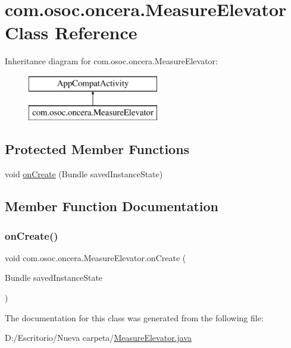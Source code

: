\hypertarget{classcom_1_1osoc_1_1oncera_1_1_measure_elevator}{}\section{com.\+osoc.\+oncera.\+Measure\+Elevator Class Reference}
\label{classcom_1_1osoc_1_1oncera_1_1_measure_elevator}
Inheritance diagram for com.\+osoc.\+oncera.\+Measure\+Elevator\+:\begin{figure}[H]
\begin{center}
\leavevmode
\includegraphics[height=2.000000cm]{classcom_1_1osoc_1_1oncera_1_1_measure_elevator}
\end{center}
\end{figure}
\subsection*{Protected Member Functions}
\begin{DoxyCompactItemize}
\item 
void \mbox{\hyperlink{classcom_1_1osoc_1_1oncera_1_1_measure_elevator_a27c3aaab3d8659cbf6de25f0f636dd6a}{on\+Create}} (Bundle saved\+Instance\+State)
\end{DoxyCompactItemize}


\subsection{Member Function Documentation}
\mbox{\label{classcom_1_1osoc_1_1oncera_1_1_measure_elevator_a27c3aaab3d8659cbf6de25f0f636dd6a}} 
\subsubsection{\texorpdfstring{onCreate()}{onCreate()}}
{\footnotesize\ttfamily void com.\+osoc.\+oncera.\+Measure\+Elevator.\+on\+Create (\begin{DoxyParamCaption}\item[{Bundle}]{saved\+Instance\+State }\end{DoxyParamCaption})\hspace{0.3cm}{\ttfamily [protected]}}



The documentation for this class was generated from the following file\+:\begin{DoxyCompactItemize}
\item 
D\+:/\+Escritorio/\+Nueva carpeta/\mbox{\hyperlink{_measure_elevator_8java}{Measure\+Elevator.\+java}}\end{DoxyCompactItemize}
